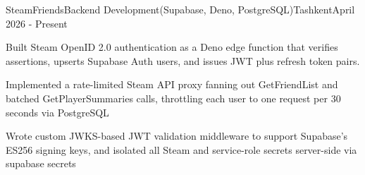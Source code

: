 \begin{resume_employer}{SteamFriends}{Backend Development(Supabase, Deno, PostgreSQL)}{Tashkent}{April 2026 - Present}
\item Built Steam OpenID 2.0 authentication as a Deno edge function that verifies assertions, upserts Supabase Auth users, and issues JWT plus refresh token pairs.
\item Implemented a rate-limited Steam API proxy fanning out GetFriendList and batched GetPlayerSummaries calls, throttling each user to one request per 30 seconds via PostgreSQL
\item Wrote custom JWKS-based JWT validation middleware to support Supabase's ES256 signing keys, and isolated all Steam and service-role secrets server-side via supabase secrets
\end{resume_employer}
